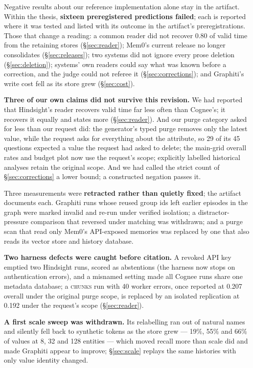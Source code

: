 \documentclass[conference]{IEEEtran}
\begin{document}
Negative results about our reference implementation alone stay in the
artifact. Within the thesis, \textbf{sixteen preregistered predictions
failed}; each is reported where it was tested and listed with its outcome in the
artifact's preregistrations. Those that change a reading: a common reader did
not recover 0.80 of valid time from the retaining stores (\S\ref{sec:reader});
Mem0's current release no longer consolidates (\S\ref{sec:releases}); two
systems did not ignore every prose deletion (\S\ref{sec:deletion}); systems'
own readers could say what was known before a correction, and the judge could
not referee it (\S\ref{sec:corrections}); and Graphiti's write cost fell as its
store grew (\S\ref{sec:cost}).

\textbf{Three of our own claims did not survive this revision.} We had reported
that Hindsight's reader recovers valid time far less often than Cognee's; it
recovers it equally and states more (\S\ref{sec:reader}). And our purge
category asked for less than our request did: the generator's typed purge
removes only the latest value, while the request asks for everything about the
attribute, so 29 of its 45 questions expected a value the request had asked to
delete; the main-grid overall rates and budget plot now use the request's
scope; explicitly labelled historical analyses retain the original scope. And we had called the strict count
of \S\ref{sec:corrections} a lower bound; a constructed negation passes it.

Three measurements were \textbf{retracted rather than quietly fixed}; the
artifact documents each. Graphiti runs whose reused group ids left earlier
episodes in the graph were marked invalid and re-run under verified isolation;
a distractor-pressure comparison that reversed under matching was withdrawn;
and a purge scan that read only Mem0's API-exposed memories was replaced by one
that also reads its vector store and history database.

\textbf{Two harness defects were caught before citation.} A revoked API key
emptied two Hindsight runs, scored as abstentions (the harness now stops on
authentication errors), and a misnamed setting made all Cognee runs share one
metadata database; a \textsc{chunks} run with 40 worker errors, once
reported at 0.207 overall under the original purge scope, is replaced by an
isolated replication at 0.192 under the request's scope
(\S\ref{sec:reader}).

\textbf{A first scale sweep was withdrawn.} Its relabelling ran out of natural
names and silently fell back to synthetic tokens as the store grew --- 19\%, 55\%
and 66\% of values at 8, 32 and 128 entities --- which moved recall more than
scale did and made Graphiti appear to improve; \S\ref{sec:scale} replays the same
histories with only value identity changed.
\end{document}
